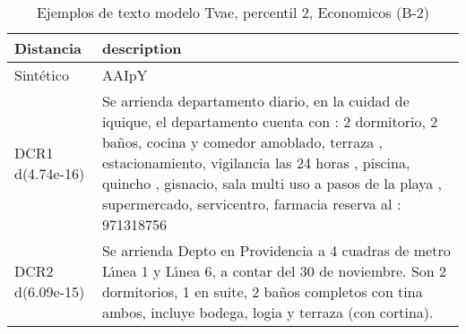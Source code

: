 \begin{table}[H]
\centering
\fontsize{10}{14}\selectfont
\caption{Ejemplos de texto modelo Tvae, percentil 2, Economicos (B-2)}
\label{table-example-economicos-b-2-tvae-2p-text}
\begin{tabular}{|l|m{35em}|}
\hline
\rowcolor[gray]{0.8}
Distancia & description \\
\hline Sintético & AAIpY \\
\hline DCR1 d(4.74e-16) & Se arrienda departamento diario, en la cuidad de iquique, el departamento cuenta con : 2 dormitorio, 2 ba\~nos, cocina y comedor amoblado, terraza , estacionamiento, vigilancia las 24 horas , piscina, quincho , gisnacio, sala multi uso a pasos de la playa , supermercado, servicentro, farmacia reserva al : 971318756 \\
\hline DCR2 d(6.09e-15) & Se arrienda Depto en Providencia a 4 cuadras de metro L{\'\i}nea 1 y L{\'\i}nea 6, a contar del 30 de noviembre. Son 2 dormitorios, 1 en suite, 2 ba\~nos completos con tina ambos, incluye bodega, logia y terraza (con cortina). \\
\hline
\end{tabular}
\end{table}
